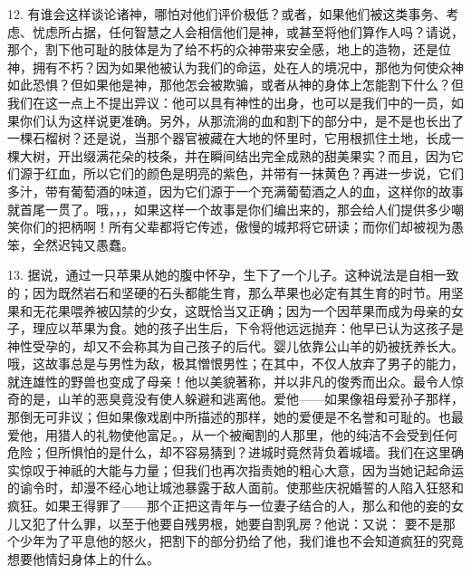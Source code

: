12. 有谁会这样谈论诸神，哪怕对他们评价极低？或者，如果他们被这类事务、考虑、忧虑所占据，任何智慧之人会相信他们是神，或甚至将他们算作人吗？请说，那个，割下他可耻的肢体是为了给不朽的众神带来安全感，地上的造物，还是位神，拥有不朽？因为如果他被认为我们的命运，处在人的境况中，那他为何使众神如此恐惧？但如果他是神，那他怎会被欺骗，或者从神的身体上怎能割下什么？但我们在这一点上不提出异议：他可以具有神性的出身，也可以是我们中的一员，如果你们认为这样说更准确。另外，从那流淌的血和割下的部分中，是不是也长出了一棵石榴树？还是说，当那个器官被藏在大地的怀里时，它用根抓住土地，长成一棵大树，开出缀满花朵的枝条，并在瞬间结出完全成熟的甜美果实？而且，因为它们源于红血，所以它们的颜色是明亮的紫色，并带有一抹黄色？再进一步说，它们多汁，带有葡萄酒的味道，因为它们源于一个充满葡萄酒之人的血，这样你的故事就首尾一贯了。哦，，，如果这样一个故事是你们编出来的，那会给人们提供多少嘲笑你们的把柄啊！所有父辈都将它传述，傲慢的城邦将它研读；而你们却被视为愚笨，全然迟钝又愚蠢。\par

13. 据说，通过一只苹果从她的腹中怀孕，生下了一个儿子。这种说法是自相一致的；因为既然岩石和坚硬的石头都能生育，那么苹果也必定有其生育的时节。用坚果和无花果喂养被囚禁的少女，这既恰当又正确；因为一个因苹果而成为母亲的女子，理应以苹果为食。她的孩子出生后，下令将他远远抛弃：他早已认为这孩子是神性受孕的，却又不会称其为自己孩子的后代。婴儿依靠公山羊的奶被抚养长大。哦，这故事总是与男性为敌，极其憎恨男性；在其中，不仅人放弃了男子的能力，就连雄性的野兽也变成了母亲！他以美貌著称，并以非凡的俊秀而出众。最令人惊奇的是，山羊的恶臭竟没有使人躲避和逃离他。爱他——如果像祖母爱孙子那样，那倒无可非议；但如果像戏剧中所描述的那样，她的爱便是不名誉和可耻的。也最爱他，用猎人的礼物使他富足。，从一个被阉割的人那里，他的纯洁不会受到任何危险；但所惧怕的是什么，却不容易猜到？进城时竟然背负着城墙。我们在这里确实惊叹于神祇的大能与力量；但我们也再次指责她的粗心大意，因为当她记起命运的谕令时，却漫不经心地让城池暴露于敌人面前。使那些庆祝婚誓的人陷入狂怒和疯狂。如果王得罪了——那个正把这青年与一位妻子结合的人，那么和他的妾的女儿又犯了什么罪，以至于他要自残男根，她要自割乳房？他说：又说： 要不是那个少年为了平息他的怒火，把割下的部分扔给了他，我们谁也不会知道疯狂的究竟想要他情妇身体上的什么。\par

